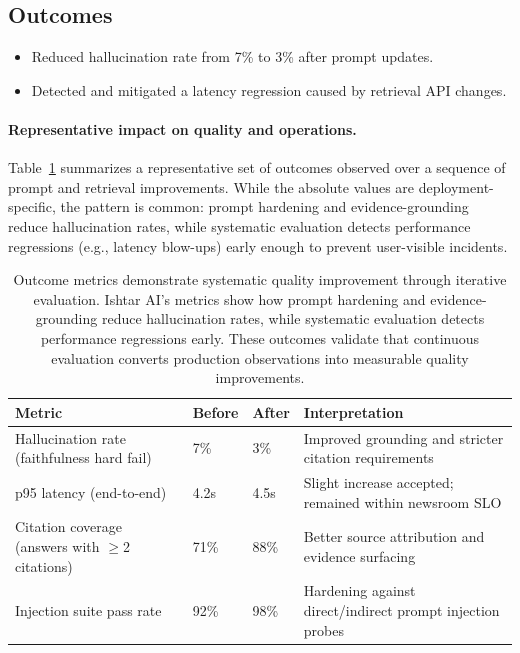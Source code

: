 \subsection{Outcomes}
\begin{itemize}
    \item Reduced hallucination rate from 7\% to 3\% after prompt updates.
    \item Detected and mitigated a latency regression caused by retrieval API changes.
\end{itemize}


\paragraph{Representative impact on quality and operations.}
Table~\ref{tab:ch10_ishtar_outcomes} summarizes a representative set of outcomes observed over a sequence of prompt and retrieval improvements.
While the absolute values are deployment-specific, the pattern is common: prompt hardening and evidence-grounding reduce hallucination rates, while systematic evaluation detects performance regressions (e.g., latency blow-ups) early enough to prevent user-visible incidents.

\begin{table}[t]
\centering
\caption{Outcome metrics demonstrate systematic quality improvement through iterative evaluation. Ishtar AI's metrics show how prompt hardening and evidence-grounding reduce hallucination rates, while systematic evaluation detects performance regressions early. These outcomes validate that continuous evaluation converts production observations into measurable quality improvements.}
\label{tab:ch10_ishtar_outcomes}
\small
\setlength{\tabcolsep}{6pt}
\renewcommand{\arraystretch}{1.3}
\begin{tabularx}{\linewidth}{@{}X p{2.2cm} p{2.2cm} X@{}}
\toprule
\rowcolor{gray!15}
\textbf{Metric} & \textbf{Before} & \textbf{After} & \textbf{Interpretation} \\
\midrule
Hallucination rate (faithfulness hard fail) & 7\% & 3\% & Improved grounding and stricter citation requirements \\
\midrule
p95 latency (end-to-end) & 4.2s & 4.5s & Slight increase accepted; remained within newsroom SLO \\
\midrule
Citation coverage (answers with $\geq$2 citations) & 71\% & 88\% & Better source attribution and evidence surfacing \\
\midrule
Injection suite pass rate & 92\% & 98\% & Hardening against direct/indirect prompt injection probes \\
\bottomrule
\end{tabularx}
\end{table}

